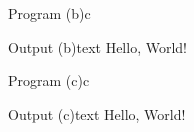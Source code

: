 \documentclass[11pt]{ipu-ai}
\begin{document}
    \begin{code}
        {Program (b)}{c}
    \end{code}%
    \begin{code}
        {Output (b)}{text}
Hello, World!
    \end{code}
    \begin{code}
        {Program (c)}{c}
    \end{code}%
    \begin{code}
        {Output (c)}{text}
Hello, World!
    \end{code}
    \vspace*{10pt}

\end{document}
